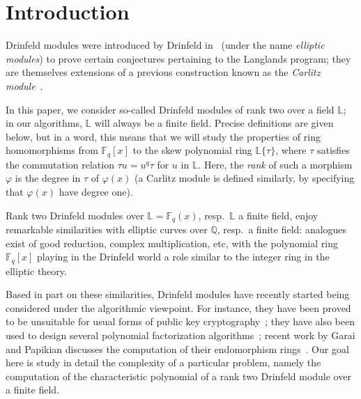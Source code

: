 \documentclass[sigconf]{acmart}
\newcommand{\Q}{\mathbb{Q}}
\newcommand{\F}{\mathbb{F}}
\renewcommand{\L}{\mathbb{L}}
\newcommand{\ang}[1]{\{#1\}}
\begin{document}
\maketitle


\section{Introduction}

Drinfeld modules were introduced by Drinfeld in~\cite{Drinfeld74}
(under the name {\em elliptic modules}) to prove certain conjectures
pertaining to the Langlands program; they are themselves extensions of
a previous construction known as the {\em Carlitz
  module}~\cite{Carlitz35}.

In this paper, we consider so-called Drinfeld modules of rank two over
a field $\L$; in our algorithms, $\L$ will always be a finite
field. Precise definitions are given below, but in a word, this means
that we will study the properties of ring homomorphisms from $\F_q[x]$ to
the skew polynomial ring $\L\ang{\tau}$, where $\tau$ satisfies the
commutation relation $\tau u = u^q \tau$ for $u$ in $\L$. Here, the
{\em rank} of such a morphism $\varphi$ is the degree in $\tau$ of
$\varphi(x)$ (a Carlitz module is defined similarly, by specifying that
$\varphi(x)$ have degree one).

Rank two Drinfeld modules over $\L=\F_q(x)$, resp.\ $\L$ a finite
field, enjoy remarkable similarities with elliptic curves over $\Q$,
resp.\ a finite field: analogues exist of good reduction, complex
multiplication, etc, with the polynomial ring $\F_q[x]$ playing in the
Drinfeld world a role similar to the integer ring in the elliptic
theory.

Based in part on these similarities, Drinfeld modules have recently
started being considered under the algorithmic viewpoint. For
instance, they have been proved to be unsuitable for usual forms of
public key cryptography~\cite{Scanlon01}; they have also been used to
design several polynomial factorization
algorithms~\cite{PaPo89,vanderHeiden04,Narayanan18,eschost2017arXiv171200669D};
recent work by Garai and Papikian discusses the computation of their
endomorphism rings~\cite{GaPa18}. Our goal here is study in detail the
complexity of a particular problem, namely the computation of the
characteristic polynomial of a rank two Drinfeld module over a finite field.
\end{document}
